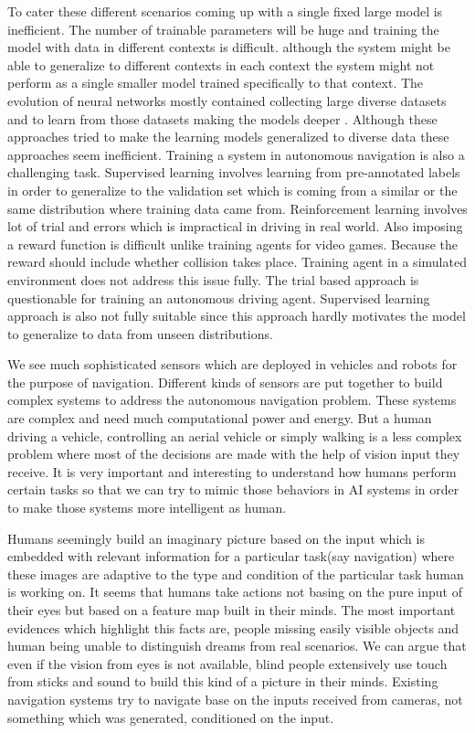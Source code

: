 To cater these different scenarios coming up with a single fixed large model is inefficient. \cite{bojarski2016end, xu2016end} The number of trainable parameters will be huge and training the model with data in different contexts is difficult. although the system might be able to generalize to different contexts in each context the system might not perform as a single smaller model trained specifically to that context. The evolution of neural networks mostly contained collecting large diverse datasets \cite{deng2009imagenet,yu2018bdd100k} and to learn from those datasets making the models deeper \cite{he2016deep}. Although these approaches tried to make the learning models generalized to diverse data these approaches seem inefficient. Training a system in autonomous navigation is also a challenging task. Supervised learning involves learning from pre-annotated labels in order to generalize to the validation set which is coming from a similar or the same distribution where training data came from. Reinforcement learning involves lot of trial and errors which is impractical in driving in real world.  Also imposing a reward function is difficult unlike training agents for video games\cite{mnih2013playing}. Because the reward should include whether collision takes place. Training agent in a simulated environment does not address this issue fully\cite{SantanaH16}. The trial based approach is questionable for training an autonomous driving agent. Supervised learning approach is also not fully suitable since this approach hardly motivates the model to generalize to data from unseen distributions. 

We see much sophisticated sensors which are deployed in vehicles and robots for the purpose of navigation. Different kinds of sensors are put together to build complex systems to address the autonomous navigation problem. These systems are complex and need much computational power and energy. But a human driving a vehicle, controlling an aerial vehicle or simply walking is a less complex problem where most of the decisions are made with the help of vision input they receive. It is very important and interesting to understand how humans perform certain tasks so that we can try to mimic those behaviors in AI systems in order to make those systems more intelligent as human. 

Humans seemingly build an imaginary picture based on the input which is embedded with relevant information for a particular task(say navigation) where these images are adaptive to the type and condition of the particular task human is working on. It seems that humans take actions not basing on the pure input of their eyes but based on a feature map built in their minds. The most important evidences which highlight this facts are, people missing easily visible objects and human being unable to distinguish dreams from real scenarios. We can argue that even if the vision from eyes is not available, blind people extensively use touch from sticks and sound to build this kind of a picture in their minds. Existing navigation systems try to navigate base on the inputs received from cameras, not something which was generated, conditioned on the input\cite{xu2016end,bojarski2016end,pomerleau1989alvinn}. 

